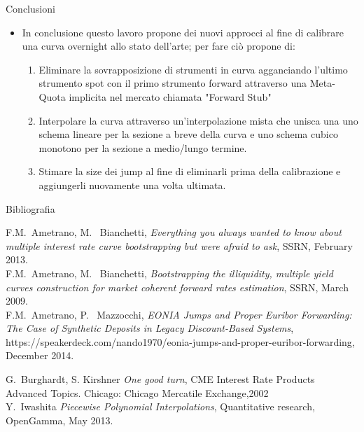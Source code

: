 \begin{tframe}{Conclusioni}
\begin{itemize}
\item In conclusione questo lavoro propone dei nuovi approcci al fine di calibrare una curva overnight allo stato dell'arte; per fare ciò propone di:
     \begin{enumerate}
         \item Eliminare la sovrapposizione di strumenti in curva agganciando l'ultimo strumento spot con il primo strumento forward attraverso una Meta-Quota implicita nel mercato chiamata "Forward Stub"
         \item Interpolare la curva attraverso un'interpolazione mista che unisca una uno schema lineare per la sezione a breve della curva e uno schema cubico monotono per la sezione a medio/lungo termine.
         \item Stimare la size dei jump al fine di eliminarli prima della calibrazione e aggiungerli nuovamente una volta ultimata.
     \end{enumerate}
\end{itemize}
\end{tframe}
\begin{tframe}{Bibliografia}

\begin{thebibliography}{9}

 F.M.~Ametrano, M. ~Bianchetti, {\em Everything you always wanted to know about multiple interest rate curve bootstrapping but were afraid to ask}, SSRN, February 2013.\\

 F.M.~Ametrano, M. ~Bianchetti, {\em Bootstrapping the illiquidity, multiple yield curves construction for market coherent forward rates estimation},
SSRN, March 2009.\\

 F.M.~Ametrano, P. ~Mazzocchi, {\em EONIA Jumps and Proper Euribor Forwarding: The Case of Synthetic Deposits in Legacy Discount-Based Systems}, https://speakerdeck.com/nando1970/eonia-jumps-and-proper-euribor-forwarding, December 2014.\\

\end{thebibliography}

\end{tframe}
\begin{tframe}

\begin{thebibliography}{9}

 G.~Burghardt, S. Kirshner {\em One good turn}, CME Interest Rate Products Advanced Topics. Chicago: Chicago Mercatile Exchange,2002\\

 Y.~Iwashita {\em Piecewise Polynomial Interpolations}, Quantitative research, OpenGamma, May 2013.\\

\end{thebibliography}

\end{tframe}
